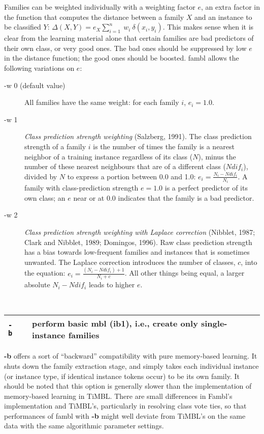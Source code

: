 \documentclass[11pt]{article}
\begin{document}
Families can be weighted individually with a weighting factor
$e$, an extra factor in the function that computes the distance
between a family $X$ and an instance to be classified $Y$:
$\Delta(X,Y) = e_{X} \sum_{i=1}^{n}\ w_{i}\
\delta(x_{i},y_{i})$. This makes sense when it is clear from the
learning material alone that certain families are bad predictors of
their own class, or very good ones. The bad ones should be suppressed
by low $e$ in the distance function; the good ones should be
boosted. {\sc fambl} allows the following variations on $e$:

\begin{description}

\item[-w 0 (default value)] All families have the same weight: for
each family $i$, $e_{i}=1.0$.

\item[-w 1] {\em Class prediction strength weighting} (Salzberg,
1991). The class prediction strength of a family $i$ is the number of
times the family is a nearest neighbor of a training instance
regardless of its class ($N$), minus the number of these nearest
neighbours that are of a different class ($Ndif_{i}$), divided by $N$
to express a portion between 0.0 and 1.0: $e_{i} =
\frac{N_{i}-Ndif_{i}}{N_{i}}$. A family with class-prediction
strength $e=1.0$ is a perfect predictor of its own class; an $e$ near
or at $0.0$ indicates that the family is a bad predictor.

\item[-w 2] {\em Class prediction strength weighting with Laplace
correction} (Nibblet, 1987; Clark and Nibblet, 1989; Domingos,
1996). Raw class prediction strength has a bias towards low-frequent
families and instances that is sometimes unwanted. The Laplace
correction introduces the number of classes, $c$, into the equation:
$e_{i} = \frac{(N_{i}-Ndif_{i})+1}{N_{i}+c}$. All other things being
equal, a larger absolute $N_{i}-Ndif_{i}$ leads to higher $e$.
\end{description}
\ \\

\begin{tabular}{|p{}|p{}|p{}|}
\hline
{\tt -b} & & perform basic {\sc mbl} ({\sc ib1}), i.e., create only 
single-instance families \\
\hline
\end{tabular}

{\bf -b} offers a sort of ``backward'' compatibility with pure
memory-based learning. It shuts down the family extraction stage, and
simply takes each individual instance (or instance type, if identical
instance tokens occur) to be its own family. It should be noted that
this option is generally slower than the implementation of
memory-based learning in {\sc TiMBL}. There are small differences in Fambl's
implementation and {\sc TiMBL}'s, particularly in resolving class vote ties,
so that performances of {\sc fambl} with {\bf -b} might well deviate
from {\sc TiMBL}'s on the same data with the same algorithmic parameter
settings. \ \\
\end{document}
